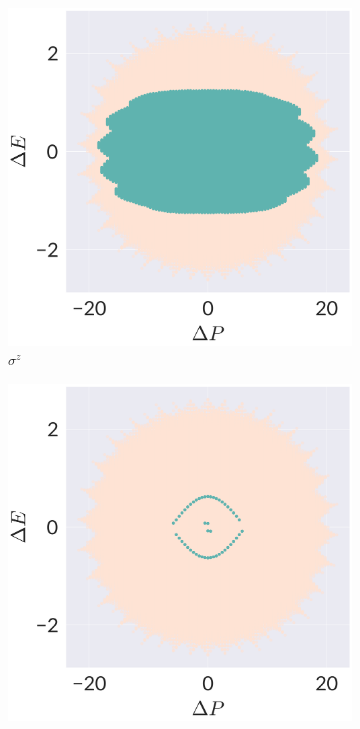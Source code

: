 \begin{figure}
	\captionsetup[subfigure]{labelformat=empty}
	\centering
\begin{subfigure}{0.5\textwidth}
\includegraphics[width=\columnwidth]{figures/chapter1/SigmaZ-NOGO-I.png}
\caption{$\sigma^z$}
\label{fig:no-go-sigma}
\end{subfigure}%
\begin{subfigure}{0.5\textwidth}
\includegraphics[width=\columnwidth]{figures/chapter1/Gamma-NOGO-I.png}

\end{subfigure}
\end{figure}
